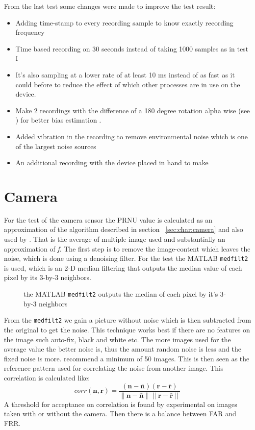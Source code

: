 From the last test some changes were made to improve the test result:
\begin{itemize}
  \item Adding time-stamp to every recording sample to know exactly recording frequency
  \item Time based recording on 30 seconds instead of taking 1000 samples as in test I
  \item It's also sampling at a lower rate of at least 10 ms instead of as fast as it could before to reduce the effect of which other processes are in use on the device.
  \item Make 2 recordings with the difference of a 180 degree rotation alpha wise (see ) for better bias estimation \cite{acc:kionixerr}.
  \item Added vibration in the recording to remove environmental noise which is one of the largest noise sources ~\cite[p.8]{acc:kionixerr} 
  \item An additional recording with the device placed in hand to make 
\end{itemize}

\section{Camera}\label{sec:test:camera}
For the test of the camera sensor the PRNU value is calculated as an approximation of the algorithm described in section ~\ref{sec:char:camera} and also used by \cite{sensor:camera:DCIdent}. That is the average of multiple image used and substantially an approximation of \textit{f}. The first step is to remove the image-content which leaves the noise, which is done using a denoising filter. For the test the MATLAB \texttt{medfilt2} is used, which is an 2-D median filtering that outputs the median value of each pixel by its 3-by-3 neighbors. 
\begin{figure}[H]
  \centering
  
  \caption{\label{fig:pyramid} the MATLAB \texttt{medfilt2} outputs the median of each pixel by it's 3-by-3 neighbors}
\end{figure}
From the \texttt{medfilt2} we gain a picture without noise which is then subtracted from the original to get the noise. This technique works best if there are no features on the image such auto-fix, black and white etc. The more images used for the average value the better noise is, thus the amount random noise is less and the fixed noise is more. \cite{sensor:camera:DCIdent} recommend a minimum of 50 images. This is then seen as the reference pattern used for correlating the noise from another image. This correlation is calculated like:
$$
corr(\boldsymbol{n},\boldsymbol{r}) = 
\frac{(\boldsymbol{n} - \bar{\boldsymbol{n}})(\boldsymbol{r} - \bar{\boldsymbol{r}})}
{\|\boldsymbol{n} - \bar{\boldsymbol{n}}\| \|\boldsymbol{r} - \bar{\boldsymbol{r}}\|}
$$
A threshold for acceptance on correlation is found by experimental on images taken with or without the camera. Then there is a balance between FAR and FRR. 

